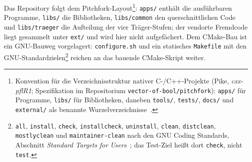 Das Repository folgt dem Pitchfork-Layout\footnote{Konvention für die Verzeichnisstruktur nativer
C-/C++-Projekte (Pike, \emph{cxx-pflR1}; Spezifikation im Repositorium \texttt{vector-of-bool/pitchfork}):
\texttt{apps/} für Programme, \texttt{libs/} für Bibliotheken, daneben \texttt{tools/}, \texttt{tests/},
\texttt{docs/} und \texttt{external/} als benannte Wurzelverzeichnisse~\cite{pike2018pitchfork}.}:
\texttt{apps/} enthält die ausführbaren Programme, \texttt{libs/} die Bibliotheken, \texttt{libs/common}
den querschnittlichen Code und \texttt{libs/traeger} die Aufteilung der vier Träger-Stufen; der vendorte
Fremdcode liegt gesammelt unter \texttt{ext/} und wird hier nicht aufgefächert. Dem CMake-Bau ist ein
GNU-Bauweg vorgelagert: \texttt{configure.sh} und ein statisches \texttt{Makefile} mit den
GNU-Standardzielen\footnote{\texttt{all}, \texttt{install}, \texttt{check}, \texttt{installcheck},
\texttt{uninstall}, \texttt{clean}, \texttt{distclean}, \texttt{mostlyclean} und
\texttt{maintainer-clean} nach den GNU Coding Standards, Abschnitt \emph{Standard Targets for
Users}~\cite{gnu2026standards}; das Test-Ziel heißt dort \texttt{check}, nicht \texttt{test}.} reichen an
das bauende CMake-Skript weiter.

